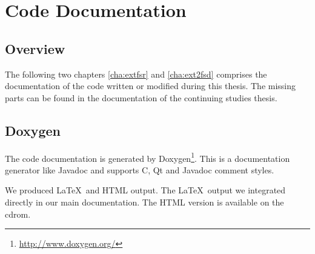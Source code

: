 \chapter{Code Documentation}
\section{Overview}
The following two chapters \ref{cha:extfsr} and \ref{cha:ext2fsd} comprises the documentation of the code written or modified during this thesis. The missing parts can be found in the documentation of the continuing studies thesis.

\section{Doxygen}
The code documentation is generated by Doxygen\footnote{\url{http://www.doxygen.org/}}. This is a documentation generator like Javadoc and supports C, Qt and Javadoc comment styles.

We produced \LaTeX\ and HTML output. The \LaTeX\ output we integrated directly in our main documentation. The HTML version is available on the cdrom.

